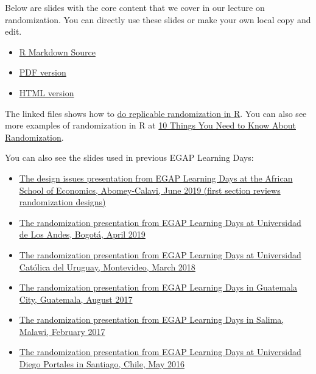 \documentclass[12pt,]{book}
\begin{document}
Below are slides with the core content that we cover in our lecture on randomization. You can directly use these slides or make your own local copy and edit.

\begin{itemize}
\item
  \href{https://egap.github.io/learningdays-resources/Slides/randomization-slides.Rmd}{R Markdown Source}
\item
  \href{https://egap.github.io/learningdays-resources/Slides/randomization-slides.pdf}{PDF version}
\item
  \href{https://egap.github.io/learningdays-resources/Slides/randomization-slides.html}{HTML version}
\end{itemize}

The linked files shows how to \href{https://egap.github.io/learningdays-resources/Exercises/randomization-exercises.Rmd}{do replicable randomization in R}. You can also see more examples of randomization in R at \href{https://egap.org/resource/10-things-to-know-about-randomization/}{10 Things You Need to Know About Randomization}.

You can also see the slides used in previous EGAP Learning Days:

\begin{itemize}
\item
  \href{https://egap.github.io/learningdays-resources/Slides/Examples/threats-benin.pdf}{The design issues presentation from EGAP Learning Days at the African School of Economics, Abomey-Calavi, June 2019 (first section reviews randomization designs)}
\item
  \href{https://egap.github.io/learningdays-resources/Slides/Examples/randomization-bogota.pdf}{The randomization presentation from EGAP Learning Days at Universidad de Los Andes, Bogotá, April 2019}
\item
  \href{https://egap.github.io/learningdays-resources/Slides/Examples/randomization-montevideo.pdf}{The randomization presentation from EGAP Learning Days at Universidad Católica del Uruguay, Montevideo, March 2018}
\item
  \href{https://egap.github.io/learningdays-resources/Slides/Examples/randomization-guatemala.pdf}{The randomization presentation from EGAP Learning Days in Guatemala City, Guatemala, August 2017}
\item
  \href{https://egap.github.io/learningdays-resources/Slides/Examples/randomization-malawi.pdf}{The randomization presentation from EGAP Learning Days in Salima, Malawi, February 2017}
\item
  \href{https://egap.github.io/learningdays-resources/Slides/Examples/randomization-santiago.pdf}{The randomization presentation from EGAP Learning Days at Universidad Diego Portales in Santiago, Chile, May 2016}
\end{itemize}
\end{document}
